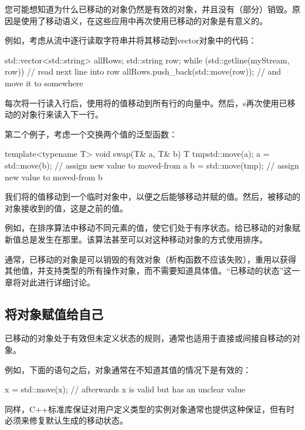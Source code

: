 您可能想知道为什么已移动的对象仍然是有效的对象，并且没有（部分）销毁。原因是使用了移动语义，在这些应用中再次使用已移动的对象是有意义的。

例如，考虑从流中逐行读取字符串并将其移动到vector对象中的代码：

\begin{cppcode}
std::vector<std::string> allRows;
std::string row;
while (std::getline(myStream, row)) { // read next line into row
	allRows.push_back(std::move(row)); // and move it to somewhere
}
\end{cppcode}

每次将一行读入行后，使用将的值移动到所有行的向量中。然后，s再次使用已移动的对象行来读入下一行。

第二个例子，考虑一个交换两个值的泛型函数：

\begin{cppcode}
template<typename T>
void swap(T& a, T& b)
{
	T tmp{std::move(a)};
	a = std::move(b); // assign new value to moved-from a
	b = std::move(tmp); // assign new value to moved-from b
}
\end{cppcode}

我们将的值移动到一个临时对象中，以便之后能够移动并赋的值。然后，被移动的对象接收到的值，这是之前的值。

例如，在排序算法中移动不同元素的值，使它们处于有序状态。给已移动的对象赋新值总是发生在那里。该算法甚至可以对这种移动对象的方式使用排序。

通常，已移动的对象是可以销毁的有效对象（析构函数不应该失败），重用以获得其他值，并支持类型的所有操作对象，而不需要知道具体值。“已移动的状态”这一章将对此进行详细讨论。

\subsection{将对象赋值给自己}

已移动的对象处于有效但未定义状态的规则，通常也适用于直接或间接自移动的对象。

例如，下面的语句之后，对象通常在不知道其值的情况下是有效的：

\begin{cppcode}
x = std::move(x); // afterwards x is valid but has an unclear value
\end{cppcode}

同样，C++标准库保证对用户定义类型的实例对象通常也提供这种保证，但有时必须来修复默认生成的移动状态。


